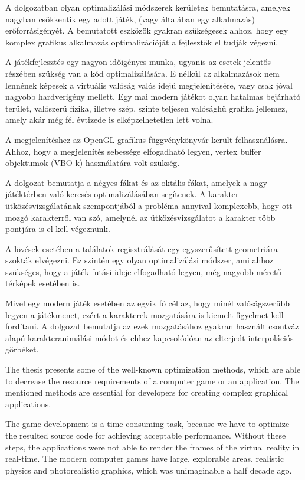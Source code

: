\label{Chap:osszegzes}

A dolgozatban olyan optimalizálási módszerek kerületek bemutatásra, amelyek nagyban csökkentik egy adott játék, (vagy általában egy alkalmazás) erőforrásigényét. A bemutatott eszközök gyakran szükségesek ahhoz, hogy egy komplex grafikus alkalmazás optimalizációját a fejlesztők el tudják végezni.

A játékfejlesztés egy nagyon időigényes munka, ugyanis az esetek jelentős részében szükség van a kód optimalizálására. E nélkül az alkalmazások nem lennének képesek a virtuális valóság valós idejű megjelenítésére, vagy csak jóval nagyobb hardverigény mellett. Egy mai modern játékot olyan hatalmas bejárható terület, valószerű fizika, illetve szép, szinte teljesen valósághű grafika jellemez, amely akár még fél évtizede is elképzelhetetlen lett volna.

A megjelenítéshez az OpenGL grafikus függvénykönyvár került felhasználásra. Ahhoz, hogy a megjelenítés sebessége elfogadható legyen, vertex buffer objektumok (VBO-k) használatára volt szükség.

A dolgozat bemutatja a négyes fákat és az oktális fákat, amelyek a nagy játéktérben való keresés optimalizálásában segítenek. A karakter ütközésvizsgálatának szempontjából a probléma annyival komplexebb, hogy ott mozgó karakterről van szó, amelynél az ütközésvizsgálatot a karakter több pontjára is el kell végeznünk.

A lövések esetében a találatok regisztrálását egy egyszerűsített geometriára szokták elvégezni. Ez szintén egy olyan optimalizálási módszer, ami ahhoz szükséges, hogy a játék futási ideje elfogadható legyen, még nagyobb méretű térképek esetében is.

Mivel egy modern játék esetében az egyik fő cél az, hogy minél valóságszerűbb legyen a játékmenet, ezért a karakterek mozgatására is kiemelt figyelmet kell fordítani. A dolgozat bemutatja az ezek mozgatásához gyakran használt csontváz alapú karakteranimálási módot és ehhez kapcsolódóan az elterjedt interpolációs görbéket.


The thesis presents some of the well-known optimization methods, which are able to decrease the resource requirements of a computer game or an application. The mentioned methods are essential for developers for creating complex graphical applications.

The game development is a time consuming task, because we have to optimize the resulted source code for achieving acceptable performance. Without these steps, the applications were not able to render the frames of the virtual reality in real-time. The modern computer games have large, explorable areas, realistic physics and photorealistic graphics, which was unimaginable a half decade ago.

